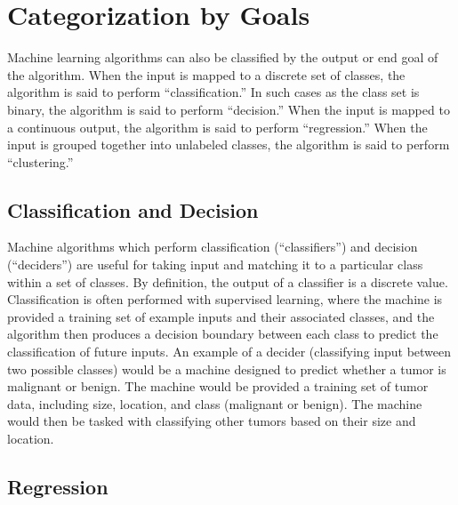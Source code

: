 
\section{Categorization by Goals} %

Machine learning algorithms can also be classified by the output or end goal of the algorithm. When the input is mapped to a discrete set of classes, the algorithm is said to perform ``classification.'' In such cases as the class set is binary, the algorithm is said to perform ``decision.'' When the input is mapped to a continuous output, the algorithm is said to perform ``regression.'' When the input is grouped together into unlabeled classes, the algorithm is said to perform ``clustering.''


\subsection{Classification and Decision} %

Machine algorithms which perform classification (``classifiers'') and decision (``deciders'') are useful for taking input and matching it to a particular class within a set of classes. By definition, the output of a classifier is a discrete value. Classification is often performed with supervised learning, where the machine is provided a training set of example inputs and their associated classes, and the algorithm then produces a decision boundary between each class to predict the classification of future inputs. An example of a decider (classifying input between two possible classes) would be a machine designed to predict whether a tumor is malignant or benign. The machine would be provided a training set of tumor data, including size, location, and class (malignant or benign). The machine would then be tasked with classifying other tumors based on their size and location. \cite{website:ng}


\subsection{Regression} %

